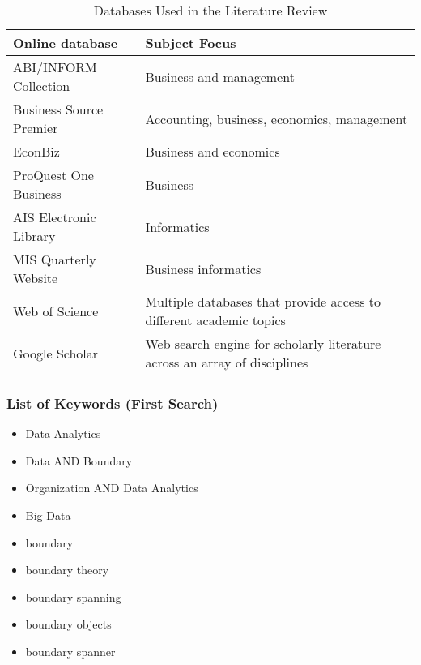 
\begin{table}[htbp]
    \centering
    \small
    \begin{tabular}{lL{8cm}}
    \hline
    Online database           & Subject Focus                                                          \\ \hline
    ABI/INFORM Collection     & Business and management                                                \\
    Business Source Premier   & Accounting, business, economics, management                            \\
    EconBiz                   & Business and economics                                                 \\
    ProQuest One Business     & Business                                                               \\
    AIS Electronic Library    & Informatics                                                            \\
    MIS Quarterly Website     & Business informatics                                                   \\
    Web of Science            & Multiple databases that provide access to different academic topics    \\
    Google Scholar            & Web search engine for scholarly literature across an array of disciplines \\ \hline
    \end{tabular}
    \caption{Databases Used in the Literature Review}
    \label{literature_search_db}
    \end{table}
    
\subsubsection*{List of Keywords (First Search)}

\begin{itemize}
    \item Data Analytics
	\item Data AND Boundary
	\item Organization AND Data Analytics
	\item Big Data
	\item boundary 
	\item boundary theory
	\item boundary spanning
	\item boundary objects
    \item boundary spanner
\end{itemize}


